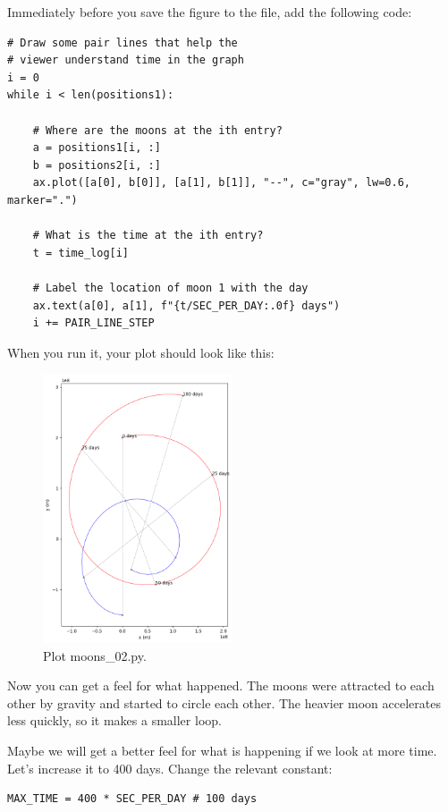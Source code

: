 Immediately before you
save the figure to the file,  add the following code:

\begin{verbatim}
# Draw some pair lines that help the
# viewer understand time in the graph
i = 0
while i < len(positions1):

    # Where are the moons at the ith entry?
    a = positions1[i, :]
    b = positions2[i, :]
    ax.plot([a[0], b[0]], [a[1], b[1]], "--", c="gray", lw=0.6, marker=".")

    # What is the time at the ith entry?
    t = time_log[i]

    # Label the location of moon 1 with the day
    ax.text(a[0], a[1], f"{t/SEC_PER_DAY:.0f} days")
    i += PAIR_LINE_STEP
\end{verbatim}

When you run it,  your plot should look like this:
\begin{figure}[htbp]
    \centering
    \includegraphics[width=0.5\textwidth]{plotmoons_02.png}
    \caption{Plot moons\_02.py.}
\end{figure}

Now you can get a feel for what happened.  The moons were attracted to each other by gravity and started to circle each other. The heavier moon accelerates less quickly,  so it makes a smaller loop.

Maybe we will get a better feel for what is happening if we look at more time. Let's increase it to 400 days. Change the relevant constant:

\begin{verbatim}
MAX_TIME = 400 * SEC_PER_DAY # 100 days
\end{verbatim}

